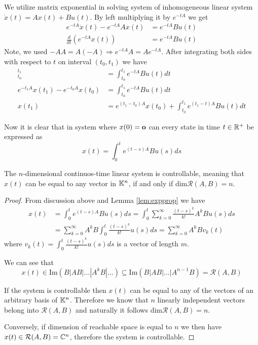 We utilize matrix exponential in solving system of inhomogeneous linear system $\dot{x}(t)=Ax(t)+Bu(t)$. By left multiplying it by $e^{-tA}$ we get
\begin{align*}
	e^{-tA}\dot{x}(t)-e^{-tA}Ax(t) &=e^{-tA}Bu(t) \\
	\frac{d}{dt} (e^{-tA}x(t)) &=e^{-tA}Bu(t) 
\end{align*}
Note, we used $-AA=A(-A)\Rightarrow e^{-tA}A=Ae^{-tA}$. After integrating both sides with respect to $t$ on interval $(t_0,t_1)$ we have 
\begin{align*}
	[e^{-tA}x(t)]^{t_1}_{t_0}&=\int^{t_1}_{t_0}e^{-tA}Bu(t)dt \\
	e^{-t_1A}x(t_1)-e^{-t_0A}x(t_0)&=\int^{t_1}_{t_0}e^{-tA}Bu(t)dt \\
	x(t_1)&=e^{(t_1-t_0)A}x(t_0)+\int^{t_1}_{t_0}e^{(t_1-t)A}Bu(t)dt
\end{align*}

Now it is clear that in system where $x(0)=\textbf{o}$ can every state in time $t\in \mathbb{R}^+$ be expressed as $$x(t)=\int^t_0 e^{(t-s)A}Bu(s)ds$$

\begin{lemma}
\label{lem:}
\end{lemma}

\begin{theorem}
	The $n$-dimensional continuos-time linear system is controllable, meaning that $x(t)$ can be equal to any vector in $\mathbb{K}^n$, if and only if $\text{dim}\mathcal{R}(A,B)=n$.
\end{theorem}

\begin{proof}
	From discussion above and Lemma \ref{lem:expprop} we have 
	\begin{align*}
		x(t)&=\int^t_0e^{(t-s)A}Bu(s)ds
		=\int^t_0\sum^\infty_{k=0}\frac{(t-s)^k}{k!}A^kBu(s)ds 
		\\
		&=\sum^\infty_{k=0}A^kB\int^t_0\frac{(t-s)^k}{k!}u(s)ds
		=\sum^\infty_{k=0}A^kBv_k(t)
	\end{align*}
	where $v_k(t)=\int^t_0\frac{(t-s)^k}{k!}u(s)ds$ is a vector of length $m$.
	
	We can see that $$x(t) \in \text{Im}(B|AB|\ldots|A^kB|\ldots)\subseteq \text{Im}(B|AB|\ldots|A^{n-1}B)=\mathcal{R}(A,B)$$ 
	
	If the system is controllable then $x(t)$ can be equal to any of the vectors of an arbitrary basis of $\mathbb{K}^n$. Therefore we know that $n$ linearly independent vectors belong into $\mathcal{R}(A,B)$ and naturally it follows $\text{dim}\mathcal{R}(A,B)=n$.

	Conversely, if dimension of reachable space is equal to $n$ we then have $x(t)\in\mathcal{R}(A,B)=\mathbb{C}^n$, therefore the system is controllable.
\end{proof}

